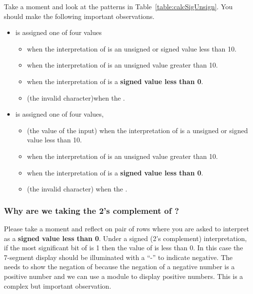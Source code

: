 Take a moment and look at the patterns in Table~\ref{table:calcSigUnsign}.  You should make the 
following important observations.
\begin{itemize}

	\item {} is assigned one of four values
	\begin{itemize}
		\item  {} when the interpretation of  is an unsigned or signed value less than  10.
		\item {} when the interpretation of  is an unsigned value greater than 10.
		\item \hdl{-} when the interpretation of  is a \textbf{signed value less than 0}.
		\item {} (the invalid character)when the .
	\end{itemize}

	\item {} is assigned one of four values, 
	\begin{itemize}
		\item {} (the value of the  input) when the interpretation of  is a unsigned or signed value less than 10.
		\item {} when the interpretation of  is an unsigned value greater than 10.
		\item {} when the interpretation of  is a \textbf{signed value less than 0}.
		\item {} (the invalid character) when the .
	\end{itemize}
\end{itemize}


\subsubsection{Why are we taking the 2's complement of ?}

Please take a moment and reflect on pair of rows where you are asked to interpret  as a \textbf{signed value less than 0}.
Under a signed (2's complement) interpretation, if the most significant bit of  is 1 then the value of  is less than 0.
In this case the   7-segment display should be illuminated with a ``-'' to indicate negative.  The  needs
to show the negation of  because the negation of a negative number is a positive number and we can use a 
module to display positive numbers.  This is a complex but important observation.

